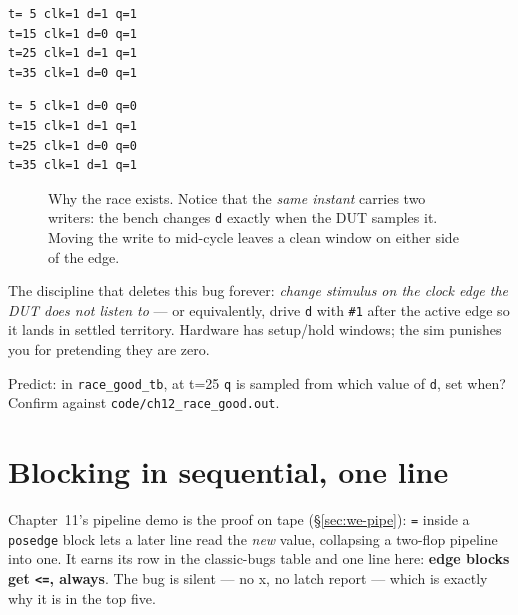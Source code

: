 \begin{lstlisting}[caption={Real run, \texttt{race\_bad\_tb}. Notice:
\texttt{d} toggles cleanly but \texttt{q} pins at 1 --- the DUT keeps
sampling the \emph{new} \texttt{d}, a stable wrong answer with no
error message anywhere.},abovecaptionskip=0pt,label={lst:racebad}]
t= 5 clk=1 d=1 q=1
t=15 clk=1 d=0 q=1
t=25 clk=1 d=1 q=1
t=35 clk=1 d=0 q=1
\end{lstlisting}

\begin{lstlisting}[caption={Real run, \texttt{race\_good\_tb}. Same
DUT, stimulus moved to \texttt{negedge}: \texttt{q} now follows
\texttt{d} one edge behind, as a flip-flop
must.},abovecaptionskip=0pt,label={lst:racegood}]
t= 5 clk=1 d=0 q=0
t=15 clk=1 d=1 q=1
t=25 clk=1 d=0 q=0
t=35 clk=1 d=1 q=1
\end{lstlisting}

\begin{figure}[htbp]
\centering

\caption{Why the race exists. Notice that the \emph{same instant}
carries two writers: the bench changes \texttt{d} exactly when the
DUT samples it. Moving the write to mid-cycle leaves a clean window
on either side of the edge.}
\label{fig:race}
\end{figure}


The discipline that deletes this bug forever: \emph{change stimulus
on the clock edge the DUT does not listen to} --- or equivalently,
drive \texttt{d} with \texttt{\#1} after the active edge so it lands
in settled territory. Hardware has setup/hold windows; the sim
punishes you for pretending they are zero.

\begin{exercise}[medium]
Predict: in \texttt{race\_good\_tb}, at t=25 \texttt{q} is sampled
from which value of \texttt{d}, set when? Confirm against
\texttt{code/ch12\_race\_good.out}.
\end{exercise}

\section{Blocking in sequential, one line}\label{sec:blockingrecap}

Chapter~11's pipeline demo is the proof on tape
(\S\ref{sec:we-pipe}): \texttt{=} inside a \texttt{posedge} block lets
a later line read the \emph{new} value, collapsing a two-flop
pipeline into one. It earns its row in the classic-bugs table and one
line here: \textbf{edge blocks get \texttt{<=}, always}. The bug is
silent --- no x, no latch report --- which is exactly why it is in
the top five.

